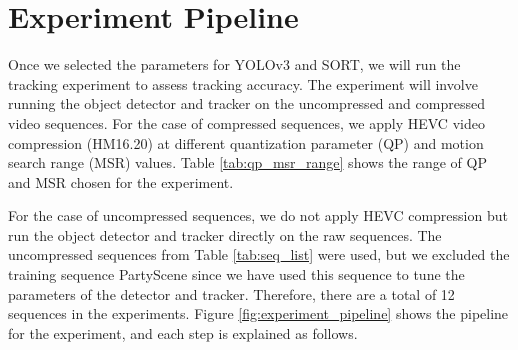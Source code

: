 \section{Experiment Pipeline}
\label{sec:methods/section_c}

Once we selected the parameters for YOLOv3 and SORT, we will run the tracking experiment to assess tracking accuracy. The experiment will involve running the object detector and tracker on the uncompressed and compressed video sequences. For the case of compressed sequences, we apply HEVC video compression (HM16.20) at different quantization parameter (QP) and motion search range (MSR) values. Table \ref{tab:qp_msr_range} shows the range of QP and MSR chosen for the experiment.

For the case of uncompressed sequences, we do not apply HEVC compression but run the object detector and tracker directly on the raw sequences. The uncompressed sequences from Table \ref{tab:seq_list} were used, but we excluded the training sequence PartyScene since we have used this sequence to tune the parameters of the detector and tracker. Therefore, there are a total of 12 sequences in the experiments. Figure \ref{fig:experiment_pipeline} shows the pipeline for the experiment, and each step is explained as follows.



